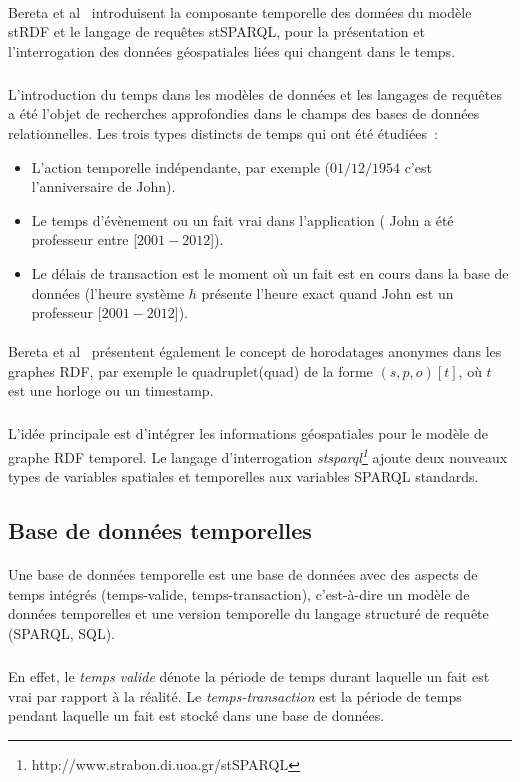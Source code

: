 \paragraph{}
Bereta et al~\cite{bereta2013} introduisent la composante temporelle des données du modèle stRDF et le langage de requêtes stSPARQL, pour la présentation et l’interrogation des données géospatiales liées qui changent dans le temps.
\subparagraph{}
L’introduction du temps dans les modèles de données et les langages de requêtes a été l’objet de recherches approfondies dans le champs des bases de données relationnelles.
\newline
Les trois types distincts de temps qui ont été étudiées~:
\begin{itemize}
\item L'action temporelle indépendante, par exemple ($01/12/1954$ c’est l’anniversaire de John).
\item Le temps d’évènement ou un fait vrai dans l’application ( John a été professeur entre [$2001-2012$]).
\item Le délais de transaction est le moment où un fait est en cours dans la base de données (l’heure système $h$ présente l’heure exact quand John est un professeur [$2001-2012$]).
\end{itemize}
\paragraph{}
Bereta et al~\cite{bereta2013} présentent également le concept de horodatages anonymes dans les graphes RDF, par exemple le quadruplet(quad) de la forme $(s, p, o)[t]$, où $t$ est une horloge ou un timestamp.
\subparagraph{}
L’idée principale est d’intégrer les informations géospatiales pour le modèle de graphe RDF temporel. Le langage d’interrogation{ \it \gls{stsparql}\footnote{http://www.strabon.di.uoa.gr/stSPARQL}} ajoute deux nouveaux types de variables spatiales et temporelles aux variables SPARQL standards.
\subsection{Base de données temporelles}
\paragraph{}
Une base de données temporelle est une base de données avec des aspects de temps intégrés (temps-valide, temps-transaction), c'est-à-dire un modèle de données temporelles et une version temporelle du langage structuré de requête (SPARQL, SQL).
\subparagraph{}
En effet, le \textit{temps valide} dénote la période de temps durant laquelle un fait est vrai par rapport à la réalité.
Le \textit{temps-transaction} est la période de temps pendant laquelle un fait est stocké dans une base de données.
